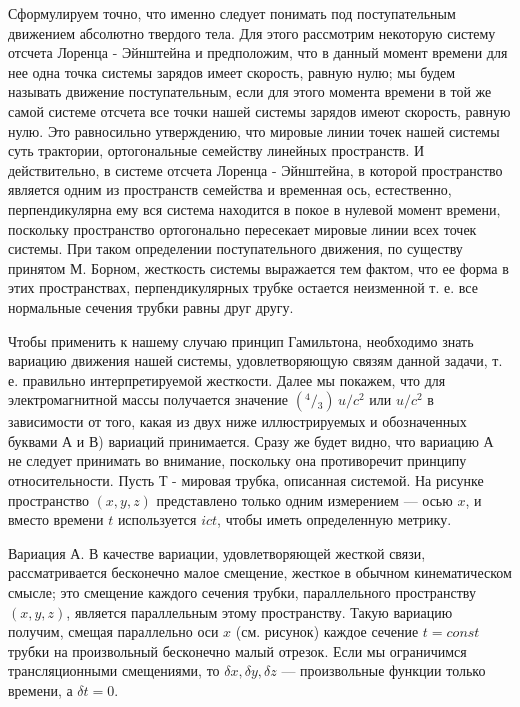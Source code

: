 \documentclass[11pt]{article}
\begin{document}
    Сформулируем точно, что именно следует понимать под поступательным
движением абсолютно твердого тела. Для этого рассмотрим некоторую
систему отсчета Лоренца - Эйнштейна и предположим, что в данный момент
времени для нее одна точка системы зарядов имеет скорость, равную нулю;
мы будем называть движение поступательным, если для этого момента
времени в той же самой системе отсчета все точки нашей системы зарядов
имеют скорость, равную нулю. Это равносильно утверждению, что мировые
линии точек нашей системы суть трактории, ортогональные семейству
линейных пространств. И действительно, в системе отсчета Лоренца -
Эйнштейна, в которой пространство является одним из пространств
семейства и временная ось, естественно, перпендикулярна ему вся система
находится в покое в нулевой момент времени, поскольку пространство
ортогонально пересекает мировые линии всех точек системы. При таком
определении поступательного движения, по существу принятом М. Борном,
жесткость системы выражается тем фактом, что ее форма в этих
пространствах, перпендикулярных трубке остается неизменной т. е. все
нормальные сечения трубки равны друг другу.

    Чтобы применить к нашему случаю принцип Гамильтона, необходимо знать
вариацию движения нашей системы, удовлетворяющую связям данной задачи,
т. е. правильно интерпретируемой жесткости. Далее мы покажем, что для
электромагнитной массы получается значение
\(\left({}^{4} \big /{}_{3}\right) \, u/c^2\) или \(u/c^2\) в
зависимости от того, какая из двух ниже иллюстрируемых и обозначенных
буквами А и В) вариаций принимается. Сразу же будет видно, что вариацию
А не следует принимать во внимание, поскольку она противоречит принципу
относительности. Пусть Т - мировая трубка, описанная системой. На
рисунке пространство \((x, y, z)\) представлено только одним измерением
--- осью \(x\), и вместо времени \(t\) используется \(ict\), чтобы иметь
определенную метрику.

    Вариация А. В качестве вариации, удовлетворяющей жесткой связи,
рассматривается бесконечно малое смещение, жесткое в обычном
кинематическом смысле; это смещение каждого сечения трубки,
параллельного пространству \((x, y, z)\), является параллельным этому
пространству. Такую вариацию получим, смещая параллельно оси \(x\) (см.
рисунок) каждое сечение \(t = const\) трубки на произвольный бесконечно
малый отрезок. Если мы ограничимся трансляционными смещениями, то
\(\delta x, \delta y, \delta z\) --- произвольные функции только времени,
а \(\delta t = 0\).
\end{document}
